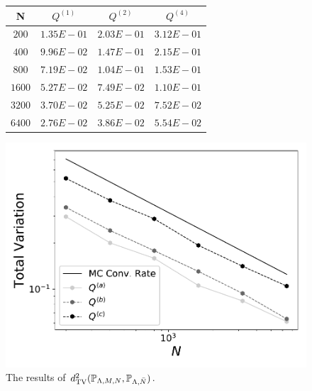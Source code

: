 \begin{figure}
\begin{minipage}{.5\textwidth}
\begin{table}[H]
\begin{tabular}{ c | c | c | c }
N & $Q^{(1)}$ & $Q^{(2)}$ & $Q^{(4)}$\\ \hline \hline
$200$ & $1.35E-01$ & $2.03E-01$ & $3.12E-01$\\ \hline

$400$ & $9.96E-02$ & $1.47E-01$ & $2.15E-01$\\ \hline

$800$ & $7.19E-02$ & $1.04E-01$ & $1.53E-01$\\ \hline

$1600$ & $5.27E-02$ & $7.49E-02$ & $1.10E-01$\\ \hline

$3200$ & $3.70E-02$ & $5.25E-02$ & $7.52E-02$\\ \hline

$6400$ & $2.76E-02$ & $3.86E-02$ & $5.54E-02$\\ \hline
\end{tabular}
\end{table}
\end{minipage}
\begin{minipage}{.45\textwidth}
		\includegraphics[width=\linewidth]{./images/Plot-reg_BigN_40000_reg_M_1_rand_I_100000}
\end{minipage}
\caption{The results of $d^2_\text{TV}(\mathbb{P}_{{\Lambda}, M, N}, \mathbb{P}_{{\Lambda},\bar{N}})$.}
\label{fig:M1_2d}
\end{figure}

